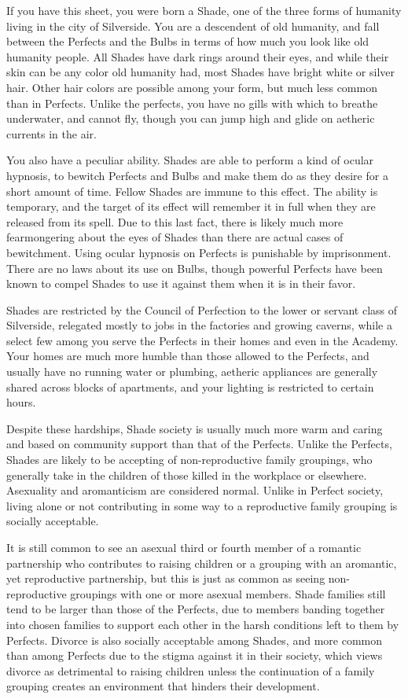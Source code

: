 \documentclass[blue]{Silversiders}
\begin{document}
\name{\bShades{}}

If you have this sheet, you were born a Shade, one of the three forms of humanity living in the city of Silverside. You are a descendent of old humanity, and fall between the Perfects and the Bulbs in terms of how much you look like old humanity people. All Shades have dark rings around their eyes, and while their skin can be any color old humanity had, most Shades have bright white or silver hair. Other hair colors are possible among your form, but much less common than in Perfects. Unlike the perfects, you have no gills with which to breathe underwater, and cannot fly, though you can jump high and glide on aetheric currents in the air.

You also have a peculiar ability. Shades are able to perform a kind of ocular hypnosis, to bewitch Perfects and Bulbs and make them do as they desire for a short amount of time. Fellow Shades are immune to this effect. The ability is temporary, and the target of its effect will remember it in full when they are released from its spell. Due to this last fact, there is likely much more fearmongering about the eyes of Shades than there are actual cases of bewitchment. Using ocular hypnosis on Perfects is punishable by imprisonment. There are no laws about its use on Bulbs, though powerful Perfects have been known to compel Shades to use it against them when it is in their favor.

Shades are restricted by the Council of Perfection to the lower or servant class of Silverside, relegated mostly to jobs in the factories and growing caverns, while a select few among you serve the Perfects in their homes and even in the Academy. Your homes are much more humble than those allowed to the Perfects, and usually have no running water or plumbing, aetheric appliances are generally shared across blocks of apartments, and your lighting is restricted to certain hours.

Despite these hardships, Shade society is usually much more warm and caring and based on community support than that of the Perfects. Unlike the Perfects, Shades are likely to be accepting of non-reproductive family groupings, who generally take in the children of those killed in the workplace or elsewhere. Asexuality and aromanticism are considered normal. Unlike in Perfect society, living alone or not contributing in some way to a reproductive family grouping is socially acceptable. 

It is still common to see an asexual third or fourth member of a romantic partnership who contributes to raising children or a grouping with an aromantic, yet reproductive partnership, but this is just as common as seeing non-reproductive groupings with one or more asexual members. Shade families still tend to be larger than those of the Perfects, due to members banding together into chosen families to support each other in the harsh conditions left to them by Perfects. Divorce is also socially acceptable among Shades, and more common than among Perfects due to the stigma against it in their society, which views divorce as detrimental to raising children unless the continuation of a family grouping creates an environment that hinders their development.
\end{document}
